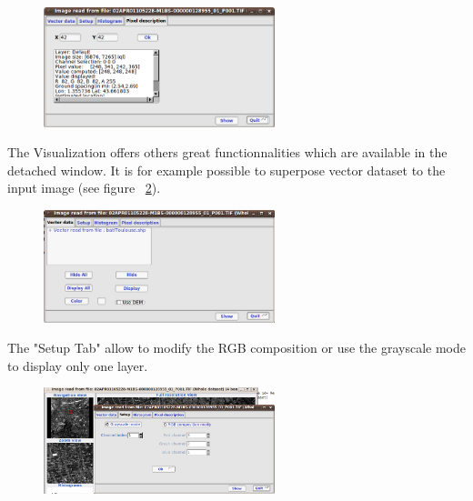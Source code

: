 \begin{figure} 
  \center
  \includegraphics[width=0.6\textwidth]{../Art/MonteverdiImages/monteverdi_viewer_pixel_description.png}
  \label{fig:viewerpixeldescription}
\end{figure}

The Visualization offers others great functionnalities which are
available in the detached window.  It is for example possible to
superpose vector dataset to the input image (see figure
~\ref{fig:viewervectordata}).

\begin{figure}
  \center
  \includegraphics[width=0.6\textwidth]{../Art/MonteverdiImages/monteverdi_viewer_vector_data.png}
  \label{fig:viewervectordata}
\end{figure}

The "Setup Tab" allow to modify the RGB composition or use the
grayscale mode to display only one layer.

\begin{figure}
  \center
  \includegraphics[width=0.6\textwidth]{../Art/MonteverdiImages/monteverdi_viewer_rgb_composition.png}
  \label{fig:rgbcomposition}
\end{figure}

